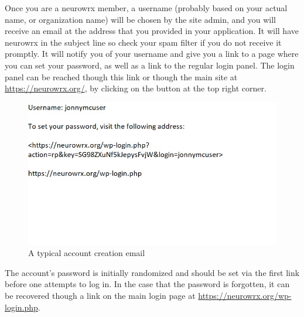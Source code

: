 \documentclass[10pt]{article}
\begin{document}
\begin{flushleft}
Once you are a neurowrx member, a username (probably based on your actual name, or organization name) will be chosen by the site admin, and you will receive an email at the address that you provided in your application.  It will have neurowrx in the subject line so check your spam filter if you do not receive it promptly.  It will notify you of your username and give you a link to a page where you can set your password, as well as a link to the regular login panel.  The login panel can be reached though this link or though the main site at \url{https://neurowrx.org/}, by clicking on the button at the top right corner. 
\end{flushleft}

\begin{figure}[h]
\centering
\caption{A typical account creation email}
\label{accountemail}
\includegraphics[scale=1.0]{images/accountcreation.jpg}
\end{figure}

The account's password is initially randomized and should be set via the first link before one attempts to log in.  In the case that the password is forgotten, it can be recovered though a link on the main login page at \url{https://neurowrx.org/wp-login.php}.
\end{document}
